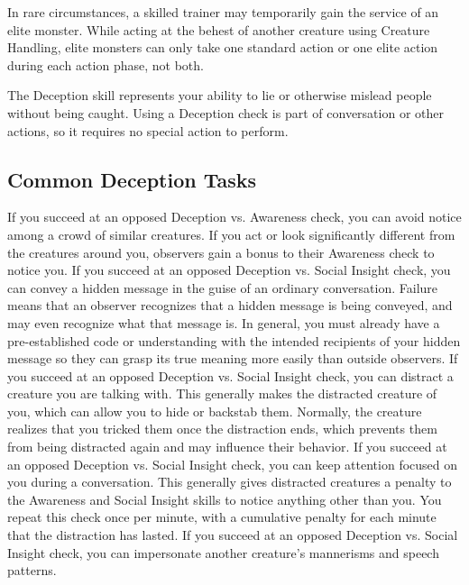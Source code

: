         In rare circumstances, a skilled trainer may temporarily gain the service of an elite monster.
        While acting at the behest of another creature using Creature Handling, elite monsters can only take one standard action or one elite action during each action phase, not both.

\newpage
{}
        The Deception skill represents your ability to lie or otherwise mislead people without being caught.
        Using a Deception check is part of conversation or other actions, so it requires no special action to perform.

    \subsection{Common Deception Tasks}
         If you succeed at an opposed Deception vs. Awareness check, you can avoid notice among a crowd of similar creatures.
        If you act or look significantly different from the creatures around you, observers gain a bonus to their Awareness check to notice you.
         If you succeed at an opposed Deception vs. Social Insight check, you can convey a hidden message in the guise of an ordinary conversation.
        Failure means that an observer recognizes that a hidden message is being conveyed, and may even recognize what that message is.
        In general, you must already have a pre-established code or understanding with the intended recipients of your hidden message so they can grasp its true meaning more easily than outside observers.
         If you succeed at an opposed Deception vs. Social Insight check, you can distract a creature you are talking with.
        This generally makes the distracted creature  \partiallyunaware of you, which can allow you to hide or backstab them.
        Normally, the creature realizes that you tricked them once the distraction ends, which prevents them from being distracted again and may influence their behavior.
         If you succeed at an opposed Deception vs. Social Insight check, you can keep attention focused on you during a conversation.
        This generally gives distracted creatures a  penalty to the Awareness and Social Insight skills to notice anything other than you.
        You repeat this check once per minute, with a cumulative  penalty for each minute that the distraction has lasted.
         If you succeed at an opposed Deception vs. Social Insight check, you can impersonate another creature's mannerisms and speech patterns.
